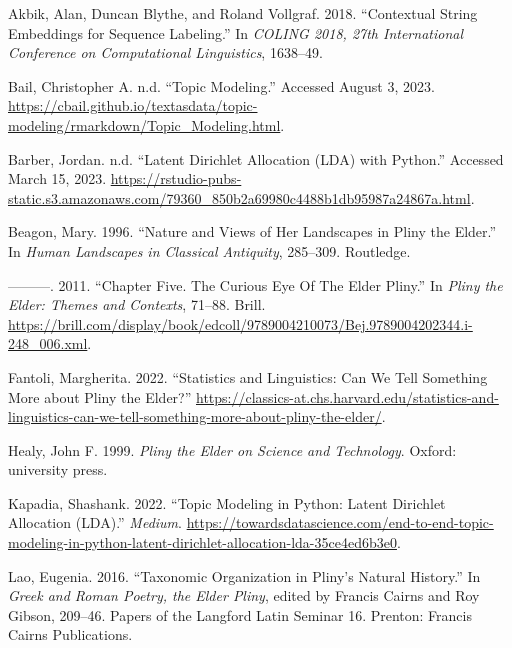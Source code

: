 \documentclass[
  12pt,
]{article}
\newlength{\cslhangindent}
\newlength{\cslentryspacingunit} %
\newenvironment{CSLReferences}[2] %
 {%
  \setlength{\parindent}{0pt}
  \ifodd #1
  \let\oldpar\par
  \def\par{\hangindent=\cslhangindent\oldpar}
  \fi
  \setlength{\parskip}{#2\cslentryspacingunit}
 }%
 {}
\begin{document}
\bigskip

\hypertarget{refs}{}
\begin{CSLReferences}{1}{0}
\leavevmode{}%
Akbik, Alan, Duncan Blythe, and Roland Vollgraf. 2018. {``Contextual
String Embeddings for Sequence Labeling.''} In \emph{{COLING} 2018, 27th
International Conference on Computational Linguistics}, 1638--49.

\leavevmode{}%
Bail, Christopher A. n.d. {``Topic {Modeling}.''} Accessed August 3,
2023.
\url{https://cbail.github.io/textasdata/topic-modeling/rmarkdown/Topic_Modeling.html}.

\leavevmode{}%
Barber, Jordan. n.d. {``Latent {Dirichlet} {Allocation} ({LDA}) with
{Python}.''} Accessed March 15, 2023.
\url{https://rstudio-pubs-static.s3.amazonaws.com/79360_850b2a69980c4488b1db95987a24867a.html}.

\leavevmode{}%
Beagon, Mary. 1996. {``Nature and Views of Her Landscapes in {Pliny} the
{Elder}.''} In \emph{Human {Landscapes} in {Classical} {Antiquity}},
285--309. Routledge.

\leavevmode{}%
---------. 2011. {``Chapter {Five}. {The} {Curious} {Eye} {Of} {The}
{Elder} {Pliny}.''} In \emph{Pliny the {Elder}: {Themes} and
{Contexts}}, 71--88. Brill.
\url{https://brill.com/display/book/edcoll/9789004210073/Bej.9789004202344.i-248_006.xml}.

\leavevmode{}%
Fantoli, Margherita. 2022. {``Statistics and Linguistics: Can We Tell
Something More about {Pliny} the {Elder}?''}
\url{https://classics-at.chs.harvard.edu/statistics-and-linguistics-can-we-tell-something-more-about-pliny-the-elder/}.

\leavevmode{}%
Healy, John F. 1999. \emph{Pliny the {Elder} on Science and Technology}.
Oxford: university press.

\leavevmode{}%
Kapadia, Shashank. 2022. {``Topic {Modeling} in {Python}: {Latent}
{Dirichlet} {Allocation} ({LDA}).''} \emph{Medium}.
\url{https://towardsdatascience.com/end-to-end-topic-modeling-in-python-latent-dirichlet-allocation-lda-35ce4ed6b3e0}.

\leavevmode{}%
Lao, Eugenia. 2016. {``Taxonomic {Organization} in {Pliny}'s {Natural}
{History}.''} In \emph{Greek and {Roman} Poetry, the {Elder} {Pliny}},
edited by Francis Cairns and Roy Gibson, 209--46. Papers of the
{Langford} {Latin} {Seminar} 16. Prenton: Francis Cairns Publications.


\end{CSLReferences}
\end{document}
